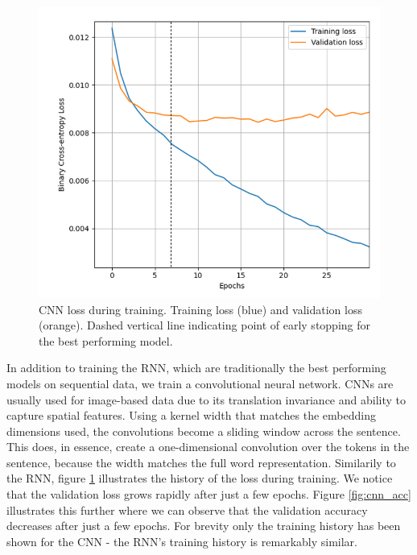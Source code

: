 \documentclass[journal, ]{IEEEtran}
\let\MYoriglatexcaption\caption
\renewcommand{\caption}[2][\relax]{\MYoriglatexcaption[#2]{#2}}
\begin{document}

\begin{figure}[hbt!]
  \centering
  \includegraphics[width=\linewidth]{imgs/CNN_LOSS.png}
  \caption{CNN loss during training. Training loss (blue) and validation loss (orange). Dashed vertical line indicating point of early stopping for the best performing model.}
  \label{fig:cnn_loss}
\end{figure}

In addition to training the RNN, which are traditionally the best performing models on sequential data, we train a convolutional neural network. CNNs are usually used for image-based data due to its translation invariance and ability to capture spatial features. Using a kernel width that matches the embedding dimensions used, the convolutions become a sliding window across the sentence. This does, in essence, create a one-dimensional convolution over the tokens in the sentence, because the width matches the full word representation. Similarily to the RNN, figure \ref{fig:cnn_loss} illustrates the history of the loss during training. We notice that the validation loss grows rapidly after just a few epochs. Figure \ref{fig:cnn_acc} illustrates this further where we can observe that the validation accuracy decreases after just a few epochs. For brevity only the training history has been shown for the CNN - the RNN's training history is remarkably similar.
\end{document}
